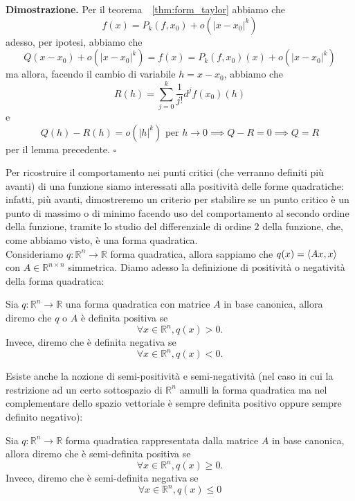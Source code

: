 \noindent \textbf{Dimostrazione. }
Per il teorema~~\ref{thm:form_taylor} abbiamo che
$$
f(x) = P_k(f, x_0) + o(|x-x_0|^k)
$$
adesso, per ipotesi, abbiamo che
$$
Q(x-x_0)+o(|x-x_0|^k) = f(x) = P_k(f, x_0)(x) + o(|x-x_0|^k)
$$
ma allora, facendo il cambio di variabile $h = x-x_0$, abbiamo che
$$
R(h) = \sum_{j=0}^k \frac{1}{j!} d^j f(x_0)(h)
$$
e
$$
Q(h) - R(h) = o(|h|^k) \text{ per } h \to 0 \implies Q - R = 0 \implies Q=R
$$
per il lemma precedente.
\hfill $\square$

Per ricostruire il comportamento nei punti critici (che verranno definiti più avanti) di una funzione siamo interessati alla positività delle forme quadratiche: infatti, più avanti, dimostreremo un criterio per stabilire se un punto critico è un punto di massimo o di minimo facendo uso del comportamento al secondo ordine della funzione, tramite lo studio del differenziale di ordine $2$ della funzione, che, come abbiamo visto, è una forma quadratica. \\
Consideriamo $q: \mathbb{R}^n \to \mathbb{R}$ forma quadratica, allora sappiamo che $q(x) = \langle Ax, x \rangle$ con $A \in \mathbb{R}^{n \times n}$ simmetrica. Diamo adesso la definizione di positività o negatività della forma quadratica:

\vspace{0.5cm}
\begin{definition}[\textcolor{blue}{forma quadratica definita positiva o negativa}]
Sia $q:\mathbb{R}^n \to \mathbb{R}$ una forma quadratica con matrice $A$ in base canonica, allora diremo che $q$ o $A$ è definita positiva se
$$
\forall x \in \mathbb{R}^n, q(x) > 0.
$$
Invece, diremo che è definita negativa se
$$
\forall x \in \mathbb{R}^n, q(x) < 0.
$$
\end{definition}

Esiste anche la nozione di semi-positività e semi-negatività (nel caso in cui la restrizione ad un certo sottospazio di $\mathbb{R}^n$ annulli la forma quadratica ma nel complementare dello spazio vettoriale è sempre definita positivo oppure sempre definito negativo):

\vspace{0.5cm}
\begin{definition}[\textcolor{blue}{forma quadratica semi-definita positiva o semi-definita negativa}]
Sia $q: \mathbb{R}^n \to \mathbb{R}$ forma quadratica rappresentata dalla matrice $A$ in base canonica, allora diremo che è semi-definita positiva se
$$
\forall x \in \mathbb{R}^n, q(x) \geq 0.
$$
Invece, diremo che è semi-definita negativa se
$$
\forall x \in \mathbb{R}^n, q(x) \leq 0
$$
\end{definition}

